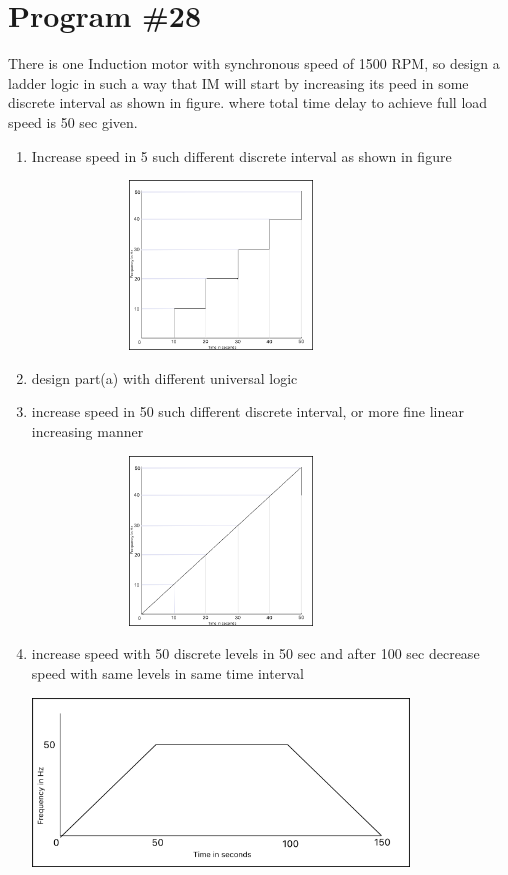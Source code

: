 \documentclass[
	12pt, %
]{fphw}
\begin{document}
  \section*{Program \#28}
  \begin{problem}There is one Induction motor with synchronous speed of 1500
    RPM, so design a ladder logic in such a way that IM will start by increasing
    its peed in some
    discrete interval
    as shown in figure. where total time delay to achieve full load speed is 50
    sec given.
\begin{enumerate}
\item Increase speed in 5 such different discrete interval as shown in
  figure
  \begin{center}
    \includegraphics[width = 100mm,height=45mm, scale = 0.8]{draw_28_a.png}
  \end{center}
\item design part(a) with different universal logic
\item increase speed in 50 such different discrete interval, or more
  fine linear increasing manner
  \begin{center}
    \includegraphics[width = 100mm, height=45mm, scale = 0.8]{draw_28_c.png}
    \end{center}  
\item increase speed with 50 discrete levels in 50 sec and after 100
  sec decrease speed with same levels in same time interval
  \begin{center}
    \includegraphics[width = 100mm, height = 45mm, scale = 0.8]{draw_28_d.png}
    \end{center}                                                
\end{enumerate}
\end{problem}
\pagebreak
\end{document}
